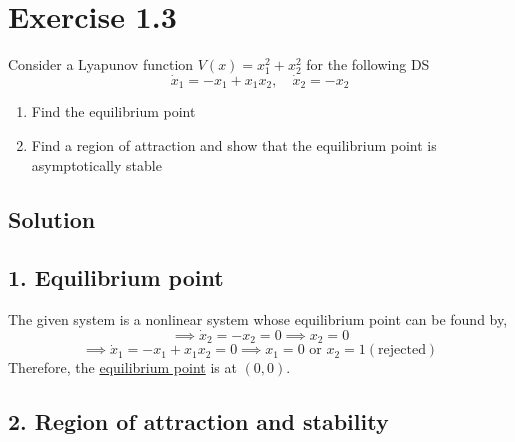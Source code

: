 \section*{Exercise 1.3}

Consider a Lyapunov function \( V(x)=x_{1}^{2}+x_{2}^{2} \) for the following DS
\begin{equation*}
    \dot{x}_{1}=-x_{1}+x_{1} x_{2}, \quad \dot{x}_{2}=-x_{2}
\end{equation*}
\begin{enumerate}[noitemsep]
    \item Find the equilibrium point
    \item Find a region of attraction and show that the equilibrium point is asymptotically stable
\end{enumerate}

\subsection*{Solution}

\subsection*{1. Equilibrium point}

The given system is a nonlinear system whose equilibrium point can be found by,
\[
    \implies
    \dot{x}_{2} = -x_{2} = 0
    \implies
    x_{2} = 0
\]
\[
    \implies
    \dot{x}_{1} = -x_{1} + x_{1} x_{2} = 0
    \implies
    x_{1} = 0 \text{ or } x_{2} = 1 (\text{rejected})
\]
Therefore, the \underline{equilibrium point} is at \( \boxed{ (0, 0) } \).

\subsection*{2. Region of attraction and stability}

